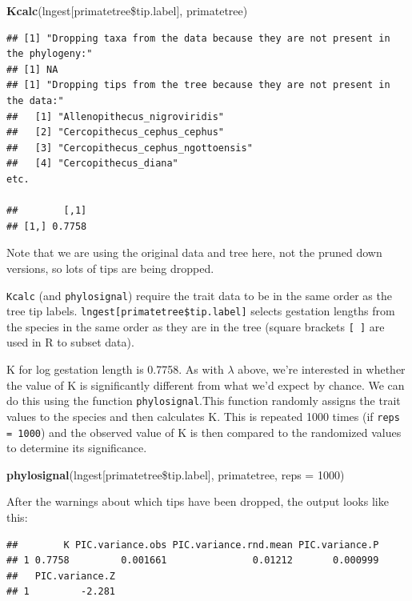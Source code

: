 \documentclass[12pt]{article}
\newcommand{\KeywordTok}[1]{\textcolor[rgb]{0.13,0.29,0.53}{\textbf{{#1}}}}
\newcommand{\DataTypeTok}[1]{\textcolor[rgb]{0.13,0.29,0.53}{{#1}}}
\newcommand{\DecValTok}[1]{\textcolor[rgb]{0.00,0.00,0.81}{{#1}}}
\newcommand{\NormalTok}[1]{{#1}}
\begin{document}
\begin{snugshade}
\begin{Highlighting}[]
\KeywordTok{Kcalc}\NormalTok{(lngest[primatetree\$tip.label], primatetree)}
\end{Highlighting}
\end{snugshade}

\begin{verbatim}
## [1] "Dropping taxa from the data because they are not present in the phylogeny:"
## [1] NA
## [1] "Dropping tips from the tree because they are not present in the data:"
##   [1] "Allenopithecus_nigroviridis"                  
##   [2] "Cercopithecus_cephus_cephus"                  
##   [3] "Cercopithecus_cephus_ngottoensis"             
##   [4] "Cercopithecus_diana"
etc.

##        [,1]
## [1,] 0.7758
\end{verbatim}

Note that we are using the original data and tree here, not the pruned down versions, so lots of tips are being dropped.

\texttt{Kcalc} (and \texttt{phylosignal}) require the trait data to be in the same order as the tree tip labels. \texttt{lngest[primatetree\$tip.label]} selects gestation lengths from the species in the same order as they are in the tree (square brackets \texttt{[ ]} are used in R to subset data).

K for log gestation length is 0.7758. As with $\lambda$ above, we’re interested in whether the value of K is significantly different from what we’d expect by chance. We can do this using the function \texttt{phylosignal}.This function randomly assigns the trait values to the species and then calculates K. This is repeated 1000 times (if \texttt{reps = 1000}) and the observed value of K is then compared to the randomized values to determine its significance.

\begin{snugshade}
\begin{Highlighting}[]
\KeywordTok{phylosignal}\NormalTok{(lngest[primatetree\$tip.label], primatetree, }\DataTypeTok{reps =} \DecValTok{1000}\NormalTok{)}
\end{Highlighting}
\end{snugshade}

After the warnings about which tips have been dropped, the output looks like this:

\begin{verbatim}
##        K PIC.variance.obs PIC.variance.rnd.mean PIC.variance.P
## 1 0.7758         0.001661               0.01212       0.000999
##   PIC.variance.Z
## 1         -2.281
\end{verbatim}
\end{document}
